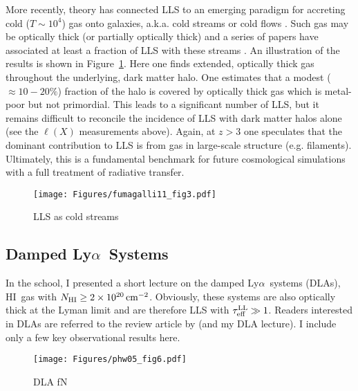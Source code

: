 \documentclass[graybox]{svmult}
\newcommand{\HI}{H{\sc I}}
\def\lya{Ly$\alpha$}
\newcommand{\mnhi}{N_{\rm HI}}
\def\cm#1{\, {\rm cm^{#1}}}
\def\mtll{\tau_{\rm eff}^{\rm LL}}
\begin{document}
More recently, theory has connected LLS to an emerging paradigm
for accreting cold ($T \sim 10^4$) gas onto galaxies,
a.k.a. cold streams or cold flows \cite[e.g.]{keres05,db06}.
Such gas may be optically thick (or partially optically thick)
and a series of papers have associated at least a fraction
of LLS with these streams
\cite[e.g.]{fg11,f11,voort12}.
An illustration of the results is shown
in Figure~\ref{fig:f11_fig3}.
Here one finds		
extended, optically thick gas throughout the underlying,
dark matter halo.
One estimates that a modest  ($\approx 10-20\%$)
fraction of the halo is covered by 
optically thick gas which is metal-poor but not primordial.  
This leads to a significant number of LLS, but it remains
difficult to reconcile the incidence of LLS with dark matter halos
alone (see the $\ell(X)$ measurements above).
Again, at $z>3$ one speculates that the 
dominant contribution to LLS is from gas in large-scale structure (e.g.
filaments).  Ultimately, this is a 
fundamental benchmark for future cosmological simulations with
a full treatment of radiative transfer.

%
\begin{figure}[b]
\sidecaption
\texttt{[image: Figures/fumagalli11\_fig3.pdf]}
%
%
\caption{LLS as cold streams
}
\label{fig:f11_fig3}       %
\end{figure}

\subsection{Damped \lya\ Systems}

In the school, I presented a short lecture on the damped \lya\
systems (DLAs), \HI\ gas with $\mnhi \ge 2 \times 10^{20} \cm{-2}$.
Obviously, these systems are also optically thick at the Lyman
limit and are therefore LLS with $\mtll \gg 1$.
Readers interested in DLAs are referred to the review article
by \cite{wgp05} (and my DLA lecture).  I include only a few key
observational results here.

%
\begin{figure}[b]
\sidecaption
\texttt{[image: Figures/phw05\_fig6.pdf]}
%
%
\caption{DLA fN
}
\label{fig:phw05_fN}       %
\end{figure}
\end{document}
